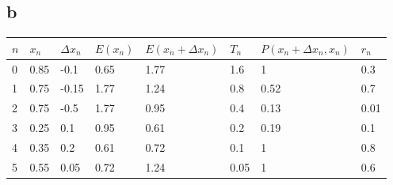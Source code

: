 \documentclass[a4paper]{article}
\begin{document}
\subsection*{b} %
\begin{table}[h]
	\centering
	\label{my-label}
	\begin{tabular}{|l|l|l|l|l|l|l|l|}
		\hline
		$n$ & $x_n$ & $\Delta x_n$ & $E(x_n)$ & $E(x_n + \Delta x_n)$ & $T_n$ & $P(x_n + \Delta x_n, x_n)$ & $r_n$ \\ \hline
		0   & 0.85  & -0.1         & 0.65     & 1.77                  & 1.6   & 1                          & 0.3   \\ \hline
		1   & 0.75  & -0.15        & 1.77     & 1.24                  & 0.8   & 0.52                       & 0.7   \\ \hline
		2   & 0.75  & -0.5         & 1.77     & 0.95                  & 0.4   & 0.13                       & 0.01  \\ \hline
		3   & 0.25  & 0.1          & 0.95     & 0.61                  & 0.2   & 0.19                       & 0.1   \\ \hline
		4   & 0.35  & 0.2          & 0.61     & 0.72                  & 0.1   & 1                          & 0.8   \\ \hline
		5   & 0.55  & 0.05         & 0.72     & 1.24                  & 0.05  & 1                          & 0.6   \\ \hline
	\end{tabular}
\end{table}
\end{document}
